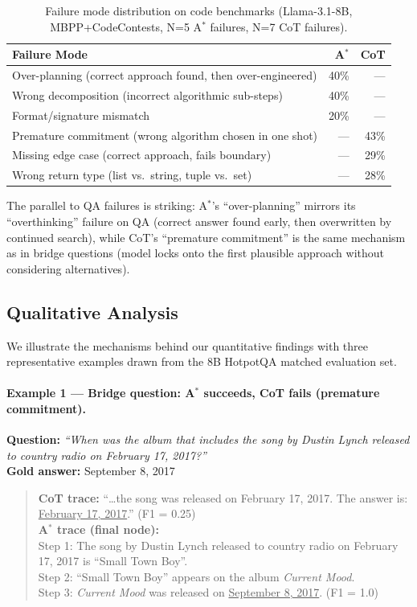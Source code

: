 \documentclass{article}
\newcommand{\astar}{A$^*$\xspace}
\begin{document}
\begin{table}[h]
\centering
\caption{Failure mode distribution on code benchmarks (Llama-3.1-8B, MBPP+CodeContests, N=5 \astar failures, N=7 CoT failures).}
\label{tab:code_failure_taxonomy}
\small
\begin{tabular}{lrr}
\toprule
Failure Mode & \astar & CoT \\
\midrule
Over-planning (correct approach found, then over-engineered) & 40\% & --- \\
Wrong decomposition (incorrect algorithmic sub-steps) & 40\% & --- \\
Format/signature mismatch & 20\% & --- \\
\midrule
Premature commitment (wrong algorithm chosen in one shot) & --- & 43\% \\
Missing edge case (correct approach, fails boundary) & --- & 29\% \\
Wrong return type (list vs.\ string, tuple vs.\ set) & --- & 28\% \\
\bottomrule
\end{tabular}
\end{table}

The parallel to QA failures is striking: \astar's ``over-planning'' mirrors its ``overthinking'' failure on QA (correct answer found early, then overwritten by continued search), while CoT's ``premature commitment'' is the same mechanism as in bridge questions (model locks onto the first plausible approach without considering alternatives).

\subsection{Qualitative Analysis}
\label{sec:qualitative}

We illustrate the mechanisms behind our quantitative findings with three representative examples drawn from the 8B HotpotQA matched evaluation set.

\paragraph{Example 1 --- Bridge question: \astar succeeds, CoT fails (premature commitment).}
\textbf{Question:} \textit{``When was the album that includes the song by Dustin Lynch released to country radio on February 17, 2017?''}\\
\textbf{Gold answer:} September 8, 2017

\begin{quote}
\textbf{CoT trace:} ``\ldots{}the song was released on February 17, 2017. The answer is: \underline{February 17, 2017}.'' (F1 = 0.25)\\[2pt]
\textbf{\astar trace (final node):}\\
Step 1: The song by Dustin Lynch released to country radio on February 17, 2017 is ``Small Town Boy''.\\
Step 2: ``Small Town Boy'' appears on the album \textit{Current Mood}.\\
Step 3: \textit{Current Mood} was released on \underline{September 8, 2017}. (F1 = 1.0)
\end{quote}
\end{document}
